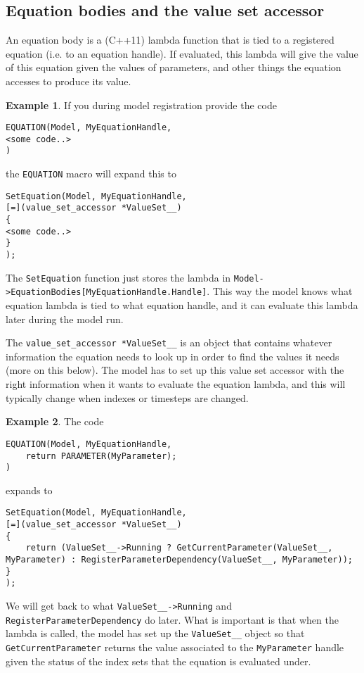 \documentclass[11pt]{article}
\theoremstyle{definition}
\newtheorem{myexample}{Example}
\newenvironment{example}%
  {\begin{lrbox}{\examplebox}%
   \begin{minipage}{\dimexpr\linewidth-2\fboxsep}
   \begin{myexample}}%
  {\end{myexample}%
   \end{minipage}%
   \end{lrbox}%
   \begin{trivlist}
     \item[]\colorbox{silver}{\usebox\examplebox}
   \end{trivlist}}
\begin{document}
\subsection{Equation bodies and the value set accessor}

An equation body is a (C++11) lambda function that is tied to a registered equation (i.e. to an equation handle). If evaluated, this lambda will give the value of this equation given the values of parameters, and other things the equation accesses to produce its value.

\begin{example}
If you during model registration provide the code
\begin{lstlisting}[style=mycpp]
EQUATION(Model, MyEquationHandle,
<some code..>
)
\end{lstlisting}
the {\tt EQUATION} macro will expand this to
\begin{lstlisting}[style=mycpp]
SetEquation(Model, MyEquationHandle,
[=](value_set_accessor *ValueSet__)
{
<some code..>
}
);
\end{lstlisting}
\end{example}
The {\tt SetEquation} function just stores the lambda in {\tt Model->EquationBodies[MyEquationHandle.Handle]}. This way the model knows what equation lambda is tied to what equation handle, and it can evaluate this lambda later during the model run.

The {\tt value\_set\_accessor *ValueSet\_\_} is an object that contains whatever information the equation needs to look up in order to find the values it needs (more on this below). The model has to set up this value set accessor with the right information when it wants to evaluate the equation lambda, and this will typically change when indexes or timesteps are changed.

\begin{example}
The code
\begin{lstlisting}[style=mycpp]
EQUATION(Model, MyEquationHandle,
	return PARAMETER(MyParameter);
)
\end{lstlisting}
expands to
\begin{lstlisting}[style=mycpp]
SetEquation(Model, MyEquationHandle,
[=](value_set_accessor *ValueSet__)
{
	return (ValueSet__->Running ? GetCurrentParameter(ValueSet__, MyParameter) : RegisterParameterDependency(ValueSet__, MyParameter));
}
);
\end{lstlisting}
\end{example}
We will get back to what {\tt ValueSet\_\_->Running} and {\tt RegisterParameterDependency} do later. What is important is that when the lambda is called, the model has set up the {\tt ValueSet\_\_} object so that {\tt GetCurrentParameter} returns the value associated to the {\tt MyParameter} handle given the status of the index sets that the equation is evaluated under.
\end{document}
